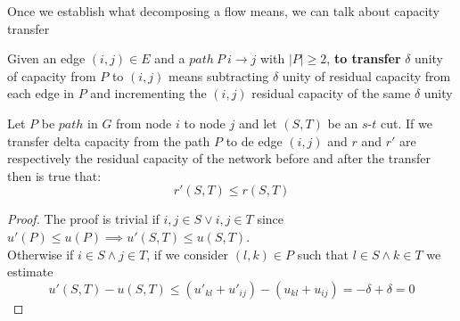 Once we establish what decomposing a flow means, we can talk about capacity transfer
\begin{definition}[Tranfer]
    Given an edge $(i,j) \in E$ and a $path\ P\ i\rightarrow j$ with $|P|\ge 2$, \textbf{to transfer} $\delta$ unity of capacity from $P$ to $(i,j)$ means subtracting $\delta$ unity of residual capacity from each edge in $P$ and incrementing the $(i,j)$ residual capacity of the same $\delta$ unity
\end{definition}
\begin{lemma}
    Let $P$ be $path$ in $G$ from node $i$ to node $j$ and let $(S,T)$ be an $s$-$t$ cut. 
    If we transfer delta capacity from the path $P$ to de edge $(i, j)$ and $r$ and $r'$ are respectively the residual capacity of the network before and after the transfer then is true that:
    \[r'(S,T) \le r(S,T)\] 
\end{lemma}
\begin{proof}
    The proof is trivial if $i,j \in S \lor i,j \in T$ since $u'(P) \le u(P) \implies u'(S,T)\le u(S,T)$.\\
    Otherwise if $i\in S \land j \in T$, if we consider $(l,k)\in P$ such that $l \in S\land k\in T$ we estimate
    \[u'(S,T)-u(S,T)\le (u'_{kl}+u'_{ij})- (u_{kl}+u_{ij}) = -\delta + \delta = 0\]
\end{proof}



